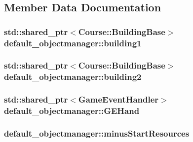 \subsection{Member Data Documentation}
\hypertarget{classdefault__objectmanager_abfc94d530e7c532c632bac4f64c2e4b1}{
\subsubsection[{building1}]{\setlength{\rightskip}{0pt plus 5cm}std\-::shared\-\_\-ptr$<${\bf Course\-::\-Building\-Base}$>$ default\-\_\-objectmanager\-::building1\hspace{0.3cm}{\ttfamily [private]}}}\label{classdefault__objectmanager_abfc94d530e7c532c632bac4f64c2e4b1}
\hypertarget{classdefault__objectmanager_a04dc230cada67d6d5ec7211bf95905f7}{
\subsubsection[{building2}]{\setlength{\rightskip}{0pt plus 5cm}std\-::shared\-\_\-ptr$<${\bf Course\-::\-Building\-Base}$>$ default\-\_\-objectmanager\-::building2\hspace{0.3cm}{\ttfamily [private]}}}\label{classdefault__objectmanager_a04dc230cada67d6d5ec7211bf95905f7}
\hypertarget{classdefault__objectmanager_af3397bf426ecdc890c61d3d69701deff}{
\subsubsection[{G\-E\-Hand}]{\setlength{\rightskip}{0pt plus 5cm}std\-::shared\-\_\-ptr$<${\bf Game\-Event\-Handler}$>$ default\-\_\-objectmanager\-::\-G\-E\-Hand\hspace{0.3cm}{\ttfamily [private]}}}\label{classdefault__objectmanager_af3397bf426ecdc890c61d3d69701deff}
\hypertarget{classdefault__objectmanager_a4a0cec3d5392cd32d7406877af357259}{
\subsubsection[{minus\-Start\-Resources}]{ default\-\_\-objectmanager\-::minus\-Start\-Resources\hspace{0.3cm}{\ttfamily [private]}}}\label{classdefault__objectmanager_a4a0cec3d5392cd32d7406877af357259}
